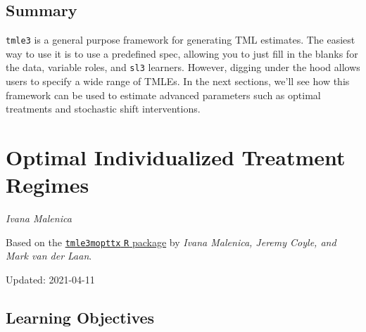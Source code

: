 \documentclass[12pt, krantz2,]{krantz}
\theoremstyle{definition}
\theoremstyle{definition}
\theoremstyle{definition}
\newcommand{\1}{\mathbbm{1}}
\begin{document}
\hypertarget{summary}{%
\subsection{Summary}\label{summary}}

\texttt{tmle3} is a general purpose framework for generating TML estimates. The easiest
way to use it is to use a predefined spec, allowing you to just fill in the
blanks for the data, variable roles, and \texttt{sl3} learners. However, digging under
the hood allows users to specify a wide range of TMLEs. In the next sections,
we'll see how this framework can be used to estimate advanced parameters such as
optimal treatments and stochastic shift interventions.

\hypertarget{optimal-individualized-treatment-regimes}{%
\section{Optimal Individualized Treatment Regimes}\label{optimal-individualized-treatment-regimes}}

\emph{Ivana Malenica}

Based on the \href{https://github.com/tlverse/tmle3mopttx}{\texttt{tmle3mopttx} \texttt{R} package}
by \emph{Ivana Malenica, Jeremy Coyle, and Mark van der Laan}.

Updated: 2021-04-11

\hypertarget{learning-objectives-4}{%
\subsection{Learning Objectives}\label{learning-objectives-4}}
\end{document}
